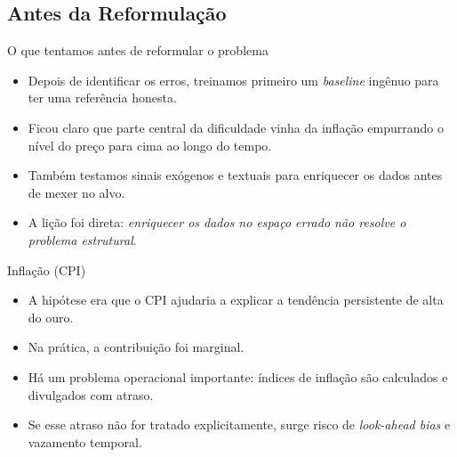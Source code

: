 \documentclass{libs/ufc_format}
\begin{document}
\subsection{Antes da Reformulação}

\begin{frame}{O que tentamos antes de reformular o problema}
    \begin{itemize}
        \item Depois de identificar os erros, treinamos primeiro um \emph{baseline} ingênuo para ter uma referência honesta.
        \item Ficou claro que parte central da dificuldade vinha da inflação empurrando o nível do preço para cima ao longo do tempo.
        \item Também testamos sinais exógenos e textuais para enriquecer os dados antes de mexer no alvo.
        \item A lição foi direta: \emph{enriquecer os dados no espaço errado não resolve o problema estrutural}.
    \end{itemize}

    \vspace{0.3cm}
\end{frame}

\begin{frame}{Inflação (CPI)}
    \begin{itemize}
        \item A hipótese era que o CPI ajudaria a explicar a tendência persistente de alta do ouro.
        \item Na prática, a contribuição foi marginal.
        \item Há um problema operacional importante: índices de inflação são calculados e divulgados com atraso.
        \item Se esse atraso não for tratado explicitamente, surge risco de \emph{look-ahead bias} e vazamento temporal.
    \end{itemize}

    \vspace{0.3cm}
\end{frame}
\end{document}
